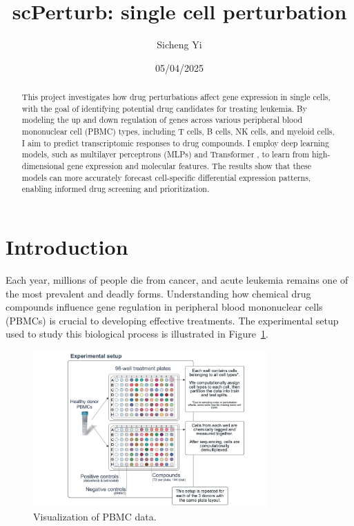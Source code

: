 \documentclass[11pt, oneside]{article}   	%
\title{scPerturb: single cell perturbation}
\author{Sicheng Yi}
\date{05/04/2025}
\begin{document}
\maketitle


\begin{abstract}
This project investigates how drug perturbations affect gene expression in single cells, with the goal of identifying potential drug candidates for treating leukemia. By modeling the up and down regulation of genes across various peripheral blood mononuclear cell (PBMC) types, including T cells, B cells, NK cells, and myeloid cells, I aim to predict transcriptomic responses to drug compounds. I employ deep learning models, such as multilayer perceptrons (MLPs) and Transformer , to learn from high-dimensional gene expression and molecular features. The results show that these models can more accurately forecast cell-specific differential expression patterns, enabling informed drug screening and prioritization.
\end{abstract}


\section*{Introduction}

Each year, millions of people die from cancer, and acute leukemia remains one of the most prevalent and deadly forms. Understanding how chemical drug compounds influence gene regulation in peripheral blood mononuclear cells (PBMCs) is crucial to developing effective treatments. The experimental setup used to study this biological process is illustrated in Figure~\ref{fig:pbmc}.


\begin{figure}[htbp]
  \centering
  \includegraphics[width=0.8\textwidth]{pbmc.png}
  \caption{Visualization of PBMC data.}
  \label{fig:pbmc}
\end{figure}
\end{document}
